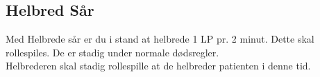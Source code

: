 \subsection{Helbred Sår}
Med Helbrede sår er du i stand at helbrede 1 LP pr. 2 minut. Dette skal rollespiles. De er stadig under normale dødsregler.\\
Helbrederen skal stadig rollespille at de helbreder patienten i denne tid.